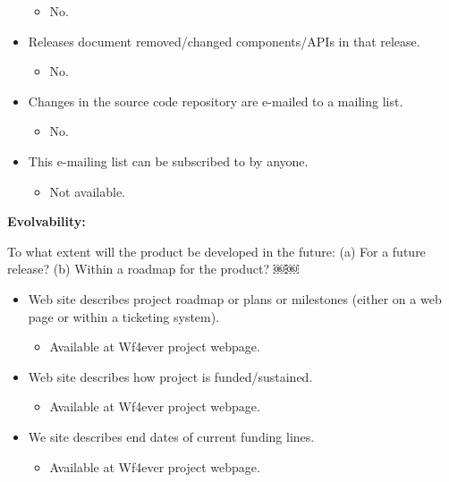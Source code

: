 \begin{itemize}
  \begin{itemize}
  \itemsep1pt\parskip0pt
  \item
    No.
  \end{itemize}
\item
  Releases document removed/changed components/APIs in that release.

  \begin{itemize}
  \itemsep1pt\parskip0pt
  \item
    No.
  \end{itemize}
\item
  Changes in the source code repository are e-mailed to a mailing list.

  \begin{itemize}
  \itemsep1pt\parskip0pt
  \item
    No.
  \end{itemize}
\item
  This e-mailing list can be subscribed to by anyone.

  \begin{itemize}
  \itemsep1pt\parskip0pt
  \item
    Not available.
  \end{itemize}
\end{itemize}

\textbf{Evolvability:}

To what extent will the product be developed in the future: (a) For a
future release? (b) Within a roadmap for the product? ￼￼

\begin{itemize}
\itemsep1pt\parskip0pt
\item
  Web site describes project roadmap or plans or milestones (either on a
  web page or within a ticketing system).

  \begin{itemize}
  \itemsep1pt\parskip0pt
  \item
    Available at Wf4ever project webpage.
  \end{itemize}
\item
  Web site describes how project is funded/sustained.

  \begin{itemize}
  \itemsep1pt\parskip0pt
  \item
    Available at Wf4ever project webpage.
  \end{itemize}
\item
  We site describes end dates of current funding lines.

  \begin{itemize}
  \itemsep1pt\parskip0pt
  \item
    Available at Wf4ever project webpage.
  \end{itemize}
\end{itemize}

